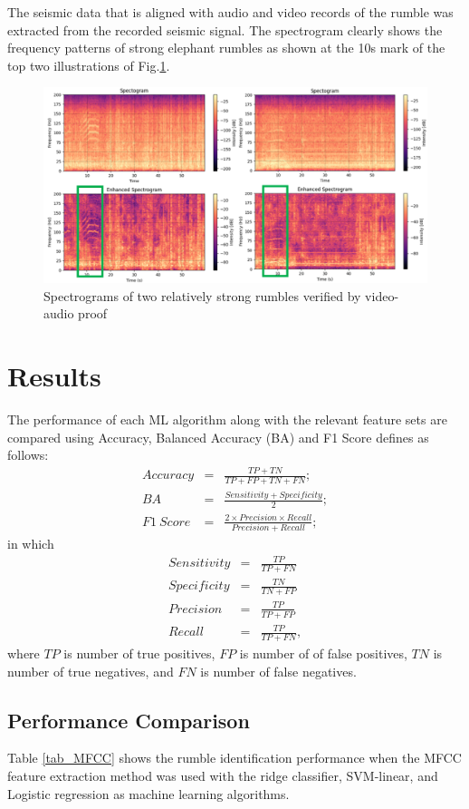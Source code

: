\documentclass[applsci,article,accept,moreauthors,pdftex]{Definitions/mdpi}
\begin{document}
The seismic data that is aligned with audio and video records of the rumble was extracted from the recorded seismic signal. The spectrogram clearly shows the frequency patterns of strong elephant rumbles as shown at the 10s mark of the top two illustrations of Fig.\ref{fig_Spectograms}.
\begin{figure}[h]
	\centering
	\includegraphics[width=5.5in]{figures/tworumbles.png}
	\caption{Spectrograms of two relatively strong rumbles verified by video-audio proof}
	\label{fig_Spectograms}
\end{figure}
\section{Results}
The performance of each ML algorithm along with the relevant feature sets are compared using Accuracy, Balanced Accuracy (BA) and F1 Score defines as follows:
\begin{eqnarray}
	Accuracy & =&  \frac{TP+TN}{TP+FP+TN+FN};\nonumber\\
	BA &=& \frac{Sensitivity+Specificity}{2};\nonumber\\
	F1~Score &=& \frac{2\times Precision\times Recall}{Precision + Recall};\nonumber
\end{eqnarray} in which
\begin{eqnarray}
	Sensitivity &=& \frac{TP}{TP+FN}\nonumber\\
	Specificity &=& \frac{TN}{TN+FP}\nonumber\\
	Precision &=&\frac{TP}{TP+FP}\nonumber\\
	Recall &=& \frac{TP}{TP+FN},\nonumber
\end{eqnarray}
where $TP$ is number of true positives, $FP$ is number of of false positives, $TN$ is number of true negatives, and $FN$ is number of false negatives.

\subsection{Performance Comparison}
Table \ref{tab_MFCC} shows the rumble identification performance when the MFCC feature extraction method was used with the ridge classifier, SVM-linear, and Logistic regression as machine learning algorithms.
\end{document}
